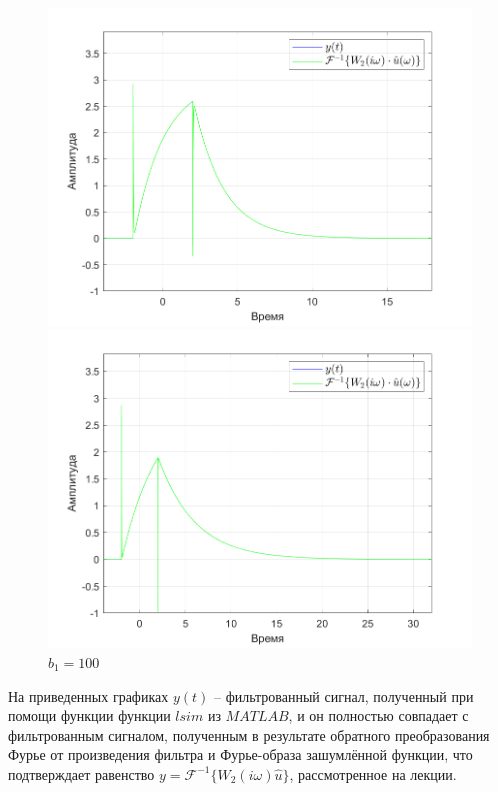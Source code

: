 \documentclass[a4paper]{article}
\begin{document}
\begin{figure}[H]
    \begin{minipage}{0.5\textwidth}
        \centering
        \includegraphics[width=\linewidth]{ex1_2/a1=0_a2=25_b1=50_b2=25_d=5/h3.png}
        \caption{$b_1=50$}
    \end{minipage}
    \begin{minipage}{0.5\textwidth}
        \centering
        \includegraphics[width=\linewidth]{ex1_2/a1=0_a2=25_b1=100_b2=25_d=5/h3.png}
        \caption{$b_1=100$}
    \end{minipage}
\end{figure}

На приведенных графиках $y(t)$ -- фильтрованный сигнал, полученный при помощи функции функции $lsim$ из $MATLAB$, и он полностью совпадает с фильтрованным сигналом, полученным в результате обратного преобразования Фурье от произведения фильтра и Фурье-образа зашумлённой функции, что подтверждает равенство $y = \mathcal{F}^{-1}\{W_2(i \omega) \hat{u}\}$, рассмотренное на лекции.
\end{document}
